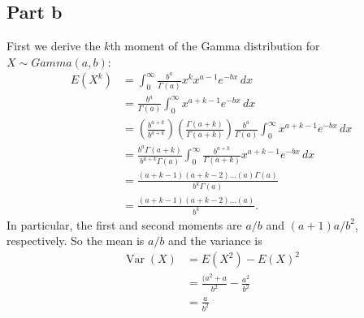 \documentclass[a4paper,10pt]{article}
\DeclareMathOperator{\Var}{Var}
\begin{document}
\subsection{Part b}
First we derive the $k$th moment of the Gamma distribution for $X \sim Gamma(a,b)$:
\begin{align*}
 E(X^k) &= \int_0^\infty {\frac{b^a}{\Gamma(a)}x^kx^{a-1} e^{-bx} \, dx} \\
 &= \frac{b^a}{\Gamma(a)} \int_0^\infty x^{a+k-1} e^{-bx} \, dx \\
 &= \left(\frac{b^{a+k}}{b^{a+k}}\right)\left(\frac{\Gamma(a+k)}{\Gamma(a+k)}\right)\frac{b^a}{\Gamma(a)} \int_0^\infty x^{a+k-1} e^{-bx} \, dx \\
 &= \frac{b^a\Gamma(a+k)}{b^{a+k}\Gamma(a)} \int_0^\infty \frac{b^{a+k}}{\Gamma(a+k)}x^{a+k-1} e^{-bx} \, dx \\
 &= \frac{(a+k-1)(a+k-2)\hdots(a)\Gamma(a)}{b^k\Gamma(a)} \\
 &= \frac{(a+k-1)(a+k-2)\hdots(a)}{b^k}.
\end{align*}
In particular, the first and second moments are $a/b$ and $(a+1)a/b^2$, respectively.  So the mean is $a/b$ and the variance is
\begin{align*}
  \Var(X) &= E(X^2) - E(X)^2 \\
  &= \frac{(a^2 + a}{b^2} - \frac{a^2}{b^2} \\
  &= \frac{a}{b^2}
\end{align*}
\end{document}
